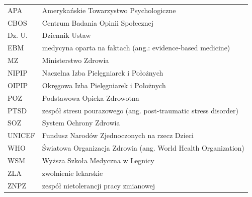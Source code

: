 \documentclass[a4paper,12pt,twoside,openright]{mwrep}
\begin{document}
\begin{table}[ht]
    
    \label{tab:index}
	\begin{tabular}{  l  l  }
	
    APA & Amerykańskie Towarzystwo Psychologiczne 	\\
	
	CBOS & Centrum Badania Opinii Społecznej\\

	Dz. U. & Dziennik Ustaw\\

	EBM & medycyna oparta na faktach (ang.: evidence-based medicine)\\

	MZ & Ministerstwo Zdrowia\\

	NIPIP & Naczelna Izba Pielęgniarek i Położnych\\

	OIPIP & Okręgowa Izba Pielęgniarek i Położnych\\

	POZ & Podstawowa Opieka Zdrowotna\\

	PTSD & zespół stresu pourazowego (ang. post-traumatic stress disorder)\\

	SOZ & System Ochrony Zdrowia\\
	
	UNICEF & Fundusz Narodów Zjednoczonych na rzecz Dzieci\\

	WHO & Światowa Organizacja Zdrowia (ang. World Health Organization)\\
	
	WSM& Wyższa Szkoła Medyczna w Legnicy\\
     
     ZLA & zwolnienie lekarskie \\

	ZNPZ & zespół nietolerancji pracy zmianowej \\
	

	
	\end{tabular}
   

\end{table}





\end{document}

